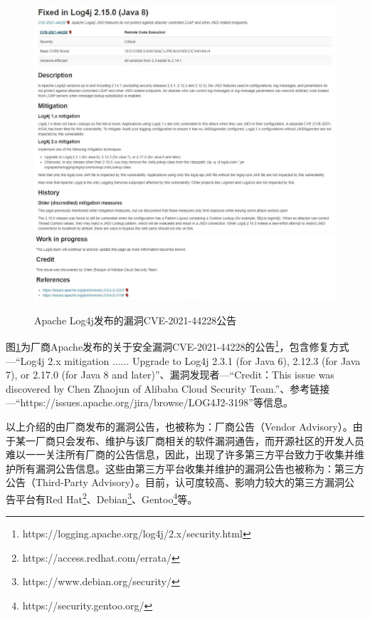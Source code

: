\begin{figure}[!t]
    \centering
    \includegraphics[width=1.0\textwidth]{fig/Vendor-2021-44228}
    \includegraphics[width=1.0\textwidth]{fig/Vendor-2021-44228-2}
    \caption{Apache Log4j发布的漏洞CVE-2021-44228公告}
    \label{fig:Vendor-2021-44228}
\end{figure}

图\ref{fig:Vendor-2021-44228}为厂商Apache发布的关于安全漏洞CVE-2021-44228的公告\footnote{https://logging.apache.org/log4j/2.x/security.html}，包含修复方式---“Log4j 2.x mitigation ...... Upgrade to Log4j 2.3.1 (for Java 6), 2.12.3 (for Java 7), or 2.17.0 (for Java 8 and later)”、漏洞发现者---“Credit：This issue was discovered by Chen Zhaojun of Alibaba Cloud Security Team.”、参考链接---“https://issues.apache.org/jira/browse/LOG4J2-3198”等信息。


以上介绍的由厂商发布的漏洞公告，也被称为：厂商公告（Vendor Advisory）。由于某一厂商只会发布、维护与该厂商相关的软件漏洞通告，而开源社区的开发人员难以一一关注所有厂商的公告信息，因此，出现了许多第三方平台致力于收集并维护所有漏洞公告信息。这些由第三方平台收集并维护的漏洞公告也被称为：第三方公告（Third-Party Advisory）。目前，认可度较高、影响力较大的第三方漏洞公告平台有Red Hat\footnote{https://access.redhat.com/errata/}、Debian\footnote{https://www.debian.org/security/}、Gentoo\footnote{https://security.gentoo.org/}等。

